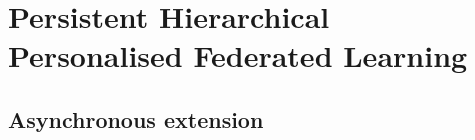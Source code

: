 \section{Persistent Hierarchical Personalised Federated Learning}


\subsection{Asynchronous extension}